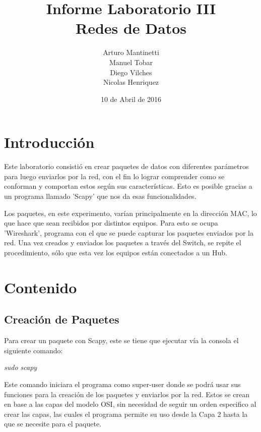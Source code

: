 \documentclass[spanish]{udpreport}
\title{Informe Laboratorio III \\ Redes de Datos}
\author{Arturo Mantinetti \\ Manuel Tobar \\ Diego Vilches \\ Nicolas Henriquez}
\date{10 de Abril de 2016} %
\begin{document}
\maketitle

\tableofcontents

\chapter{Introducción}

Este laboratorio consistió en crear paquetes de datos con diferentes parámetros para luego enviarlos por la red, con el fin lo lograr comprender como se conforman y comportan estos según sus características. Esto es posible gracias a un programa llamado 'Scapy' que nos da esas funcionalidades. 

Los paquetes, en este experimento, varían principalmente en la dirección MAC, lo que hace que sean recibidos por distintos equipos. Para esto se ocupa 'Wireshark', programa con el que se puede capturar los paquetes enviados por la red.  Una vez creados y enviados los paquetes a través del Switch, se repite el procedimiento, sólo que esta vez los equipos están conectados a un Hub. 



\chapter{Contenido}

\section{Creación de Paquetes}
Para crear un paquete con Scapy, este se tiene que ejecutar vía la consola el siguiente comando:
\begin{center}
	\emph{sudo scapy}
\end{center}

Este comando iniciara el programa como super-user donde se podrá usar sus funciones para la creación de los paquetes y enviarlos por la red. Estos se crean en base a las capas del modelo OSI, sin necesidad de seguir un orden especifico al crear las capas, las cuales el programa permite su uso desde la Capa 2 hasta la que se necesite para el paquete.
\end{document}
